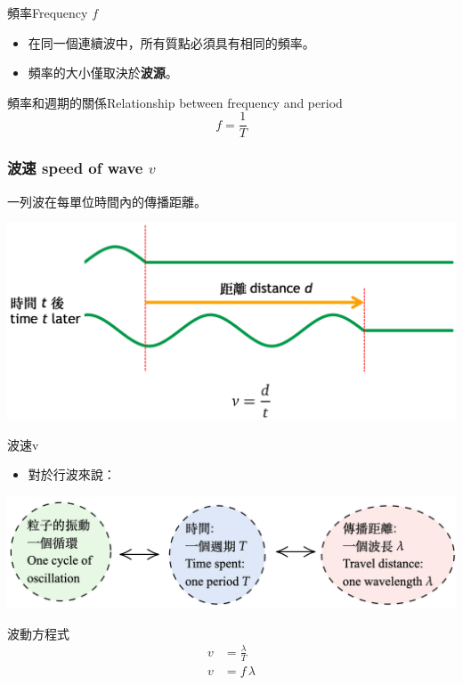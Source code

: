 \documentclass[beamer=true]{standalone}
\begin{document}
\begin{frame}{頻率Frequency $f$}
    \begin{itemize}
        \item 在同一個連續波中，所有質點必須具有相同的頻率。
        \item 頻率的大小僅取決於\textbf{波源}。
    \end{itemize}\bigskip
    \begin{alertblock}{頻率和週期的關係Relationship between frequency and period}
        \[f=\frac{1}{T}\]
    \end{alertblock}
\end{frame}

\begin{frame}
    \frametitle{波速 speed of wave $v$}
    一列波在每單位時間內的傳播距離。
    \par{\par\centering\includegraphics[width=\textwidth]{./img/ch1_2024-05-08-15-14-23.png}\par}
\end{frame}

\begin{frame}{波速v}
    \begin{itemize}
        \item 對於行波來說：
    \end{itemize}\bigskip
    \par{\par\centering\includegraphics[width=\textwidth]{./img/ch1_2024-05-08-15-56-03.png}\par}

    \begin{alertblock}{波動方程式}
        \begin{align*}
            v & =\frac{\lambda}{T} \\
            v & =f\,\lambda
        \end{align*}
    \end{alertblock}
\end{frame}
\end{document}
